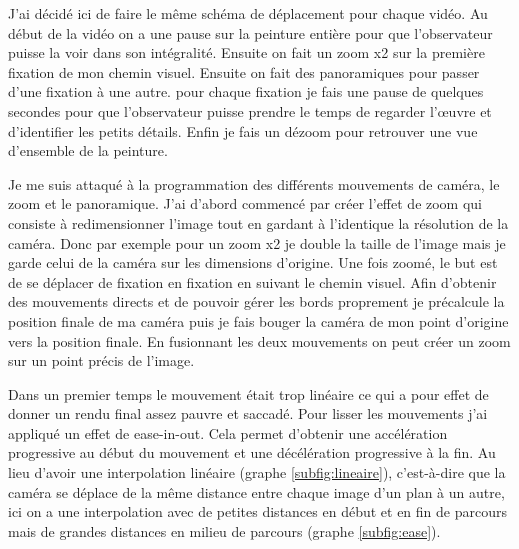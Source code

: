 \par
J'ai décidé ici de faire le même schéma de déplacement pour chaque vidéo. Au début de la vidéo on a une pause sur la peinture entière pour que l'observateur puisse la voir dans son intégralité. Ensuite on fait un zoom x2 sur la première fixation de mon chemin visuel. Ensuite on fait des panoramiques pour passer d'une fixation à une autre. pour chaque fixation je fais une pause de quelques secondes pour que l'observateur puisse prendre le temps de regarder l'\oe uvre et d'identifier les petits détails. Enfin je fais un dézoom pour retrouver une vue d'ensemble de la peinture.

\par
Je me suis attaqué à la programmation des différents mouvements de caméra, le zoom et le panoramique. J'ai d'abord commencé par créer l'effet de zoom qui consiste à redimensionner l'image tout en gardant à l'identique la résolution de la caméra. Donc par exemple pour un zoom x2 je double la taille de l'image mais je garde celui de la caméra sur les dimensions d'origine. Une fois zoomé, le but est de se déplacer de fixation en fixation en suivant le chemin visuel. Afin d'obtenir des mouvements directs et de pouvoir gérer les bords proprement je précalcule la position finale de ma caméra puis je fais bouger la caméra de mon point d'origine vers la position finale. En fusionnant les deux mouvements on peut créer un zoom sur un point précis de l'image.

\par
Dans un premier temps le mouvement était trop linéaire ce qui a pour effet de donner un rendu final assez pauvre et saccadé. Pour lisser les mouvements j'ai appliqué un effet de ease-in-out. Cela permet d'obtenir une accélération progressive au début du mouvement et une décélération progressive à la fin. Au lieu d'avoir une interpolation linéaire (graphe \ref{subfig:lineaire}), c'est-à-dire que la caméra se déplace de la même distance entre chaque image d'un plan à un autre, ici on a une interpolation avec de petites distances en début et en fin de parcours mais de grandes distances en milieu de parcours (graphe \ref{subfig:ease}).

